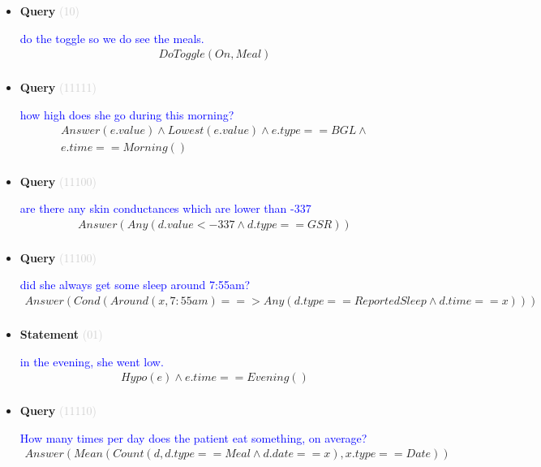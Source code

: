 \documentclass[11pt]{article}
\newcommand{\key}[1]{\textcolor{lightgray}{#1}}
\newcounter{CQuery}
\newcounter{CStatement}
\begin{document}
\begin{itemize}
\item
\textbf{Query\theCQuery} \key{(10)} \addtocounter{CQuery}{1}
\textcolor{blue}{ do the toggle so we do see the meals. }
\begin{multline*}
DoToggle(On, Meal) \\ 
\end{multline*}


\item
\textbf{Query\theCQuery} \key{(11111)} \addtocounter{CQuery}{1}
\textcolor{blue}{ how high does she go during this morning? }
\begin{multline*}
Answer(e.value) \wedge Lowest(e.value) \wedge e.type==BGL \wedge \\ 
e.time==Morning() \\ 
\end{multline*}


\item
\textbf{Query\theCQuery} \key{(11100)} \addtocounter{CQuery}{1}
\textcolor{blue}{ are there any skin conductances which are lower than -337 }
\begin{multline*}
Answer(Any(d.value<-337 \wedge d.type==GSR)) \\ 
\end{multline*}


\item
\textbf{Query\theCQuery} \key{(11100)} \addtocounter{CQuery}{1}
\textcolor{blue}{ did she always get some sleep around 7:55am? }
\begin{multline*}
Answer(Cond(Around(x, 7:55am) ==> Any(d.type==ReportedSleep \wedge d.time==x))) \\ 
\end{multline*}


\item
\textbf{Statement\theCStatement} \key{(01)} \addtocounter{CStatement}{1}
\textcolor{blue}{ in the evening, she went low. }
\begin{multline*}
Hypo(e) \wedge e.time==Evening() \\ 
\end{multline*}


\item
\textbf{Query\theCQuery} \key{(11110)} \addtocounter{CQuery}{1}
\textcolor{blue}{ How many times per day does the patient eat something, on average? }
\begin{multline*}
Answer(Mean(Count(d, d.type==Meal \wedge d.date==x), x.type==Date)) \\ 
\end{multline*}



\end{itemize}
\end{document}
